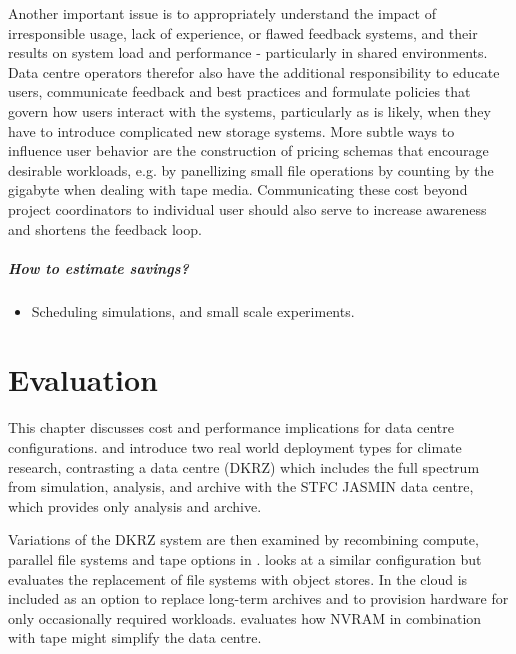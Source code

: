 \documentclass{../../template/esiwace-report}
\begin{document}
Another important issue is to appropriately understand the impact of irresponsible usage, lack of experience, or flawed feedback systems, and their results on system load and performance - particularly in shared environments.
Data centre operators therefor also have the additional responsibility to educate users, communicate feedback and best practices and formulate policies that govern how users interact with the systems, particularly as is likely, when they have to introduce
complicated new storage systems. More subtle ways to influence user behavior are the construction of pricing schemas that encourage desirable workloads, e.g. by panellizing small file operations by counting by the gigabyte when dealing with tape media.
Communicating these cost beyond project coordinators to individual user should also serve to increase awareness and shortens the feedback loop.



\paragraph{How to estimate savings?}
\begin{itemize}
	\item Scheduling simulations, and small scale experiments.
\end{itemize}

%




\chapter{Evaluation}
\label{sec:evaluation}

This chapter discusses cost and performance implications for data centre configurations. 
 and  introduce two real world deployment types for climate research, contrasting a data centre (DKRZ) which includes the full spectrum from simulation, analysis, and archive with the STFC JASMIN data centre, which provides only analysis and archive.

Variations of the DKRZ system are then examined by recombining compute, parallel file systems and tape options in .
 looks at a similar configuration but evaluates the replacement of file systems with object stores.
In  the cloud is included as an option to replace long-term archives and to provision hardware for only occasionally required workloads.
 evaluates how NVRAM in combination with tape might simplify the data centre.
\end{document}
